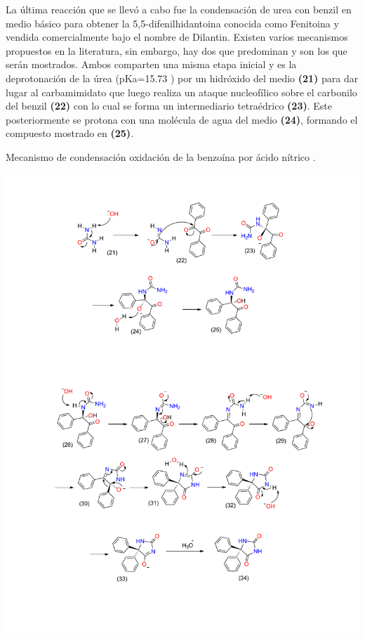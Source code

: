 \documentclass[fleqn,10pt]{SelfArx}
\begin{document}
La última reacción que se llevó a cabo fue la condensación de urea con benzil en medio básico para obtener la 5,5-difenilhidantoina conocida como Fenitoina y vendida comercialmente bajo el nombre de Dilantin. Existen varios mecanismos propuestos en la literatura, sin embargo, hay dos que predominan y son los que serán mostrados. Ambos comparten una misma etapa inicial y es la deprotonación de la úrea (pKa=15.73 \cite{urea}) por un hidróxido del medio \textbf{(21)} para dar lugar al carbamimidato que luego realiza un ataque nucleofílico sobre el carbonilo del benzil \textbf{(22)} con lo cual se forma un intermediario tetraédrico \textbf{(23)}. Este posteriormente se protona con una molécula de agua del medio \textbf{(24)}, formando el compuesto mostrado en \textbf{(25)}. 
\begin{scheme}[h]
	\centering
	\caption{Mecanismo de condensaci\'on oxidaci\'on de la benzo\'ina por \'acido n\'itrico \cite{pavia2010}.}
	\includegraphics[width=\linewidth]{structures/dilantinesquema1.pdf}
\end{scheme}
\end{document}
